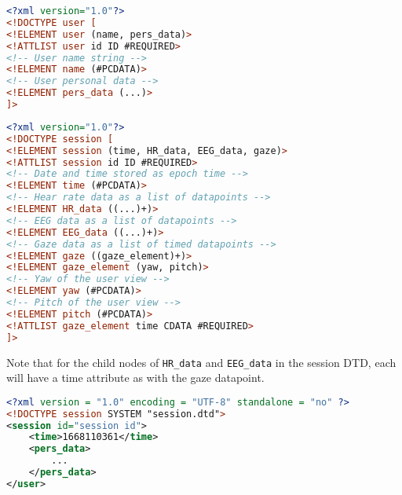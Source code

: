 \documentclass[coverpage,lineno]{../custom}
\begin{document}
\begin{lstlisting}[language=XML,caption={General DTD for user database}]
<?xml version="1.0"?>
<!DOCTYPE user [
<!ELEMENT user (name, pers_data)>
<!ATTLIST user id ID #REQUIRED>
<!-- User name string -->
<!ELEMENT name (#PCDATA)>
<!-- User personal data -->
<!ELEMENT pers_data (...)>
]>
\end{lstlisting}

\begin{lstlisting}[language=XML,caption={General DTD for session database}]
<?xml version="1.0"?>
<!DOCTYPE session [
<!ELEMENT session (time, HR_data, EEG_data, gaze)>
<!ATTLIST session id ID #REQUIRED>
<!-- Date and time stored as epoch time -->
<!ELEMENT time (#PCDATA)>
<!-- Hear rate data as a list of datapoints -->
<!ELEMENT HR_data ((...)+)>
<!-- EEG data as a list of datapoints -->
<!ELEMENT EEG_data ((...)+)>
<!-- Gaze data as a list of timed datapoints -->
<!ELEMENT gaze ((gaze_element)+)>
<!ELEMENT gaze_element (yaw, pitch)>
<!-- Yaw of the user view -->
<!ELEMENT yaw (#PCDATA)>
<!-- Pitch of the user view -->
<!ELEMENT pitch (#PCDATA)>
<!ATTLIST gaze_element time CDATA #REQUIRED>
]>
\end{lstlisting}

Note that for the child nodes of \texttt{HR\_data} and \texttt{EEG\_data} in the session DTD, each will have a time attribute as with the gaze datapoint.


\begin{lstlisting}[language=XML,caption={Sample session XML file}]
<?xml version = "1.0" encoding = "UTF-8" standalone = "no" ?>
<!DOCTYPE session SYSTEM "session.dtd">
<session id="session id">
	<time>1668110361</time>
	<pers_data>
		...
	</pers_data>
</user>
\end{lstlisting}

\printbibliography
\end{document}
